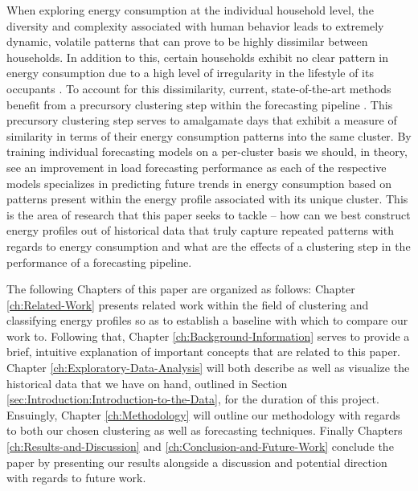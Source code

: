 \noindent \newline When exploring energy consumption at the individual household level, the diversity and complexity associated with human behavior leads to extremely dynamic, volatile patterns that can prove to be highly dissimilar between households. In addition to this, certain households exhibit no clear pattern in energy consumption due to a high level of irregularity in the lifestyle of its occupants \cite{Kong}. To account for this dissimilarity, current, state-of-the-art methods benefit from a precursory clustering step within the forecasting pipeline \cite{Yildiz, Kong, Hsiao}. This precursory clustering step serves to amalgamate days that exhibit a measure of similarity in terms of their energy consumption patterns into the same cluster. By training individual forecasting models on a per-cluster basis we should, in theory, see an improvement in load forecasting performance as each of the respective models specializes in predicting future trends in energy consumption based on patterns present within the energy profile associated with its unique cluster. This is the area of research that this paper seeks to tackle -- how can we best construct energy profiles out of historical data that truly capture repeated patterns with regards to energy consumption and what are the effects of a clustering step in the performance of a forecasting pipeline.

\noindent \newline The following Chapters of this paper are organized as follows: Chapter \ref{ch:Related-Work} presents related work within the field of clustering and classifying energy profiles so as to establish a baseline with which to compare our work to. Following that, Chapter \ref{ch:Background-Information} serves to provide a brief, intuitive explanation of important concepts that are related to this paper. Chapter \ref{ch:Exploratory-Data-Analysis} will both describe as well as visualize the historical data that we have on hand, outlined in Section \ref{sec:Introduction:Introduction-to-the-Data}, for the duration of this project. Ensuingly, Chapter \ref{ch:Methodology} will outline our methodology with regards to both our chosen clustering as well as forecasting techniques. Finally Chapters \ref{ch:Results-and-Discussion} and \ref{ch:Conclusion-and-Future-Work} conclude the paper by presenting our results alongside a discussion and potential direction with regards to future work.

